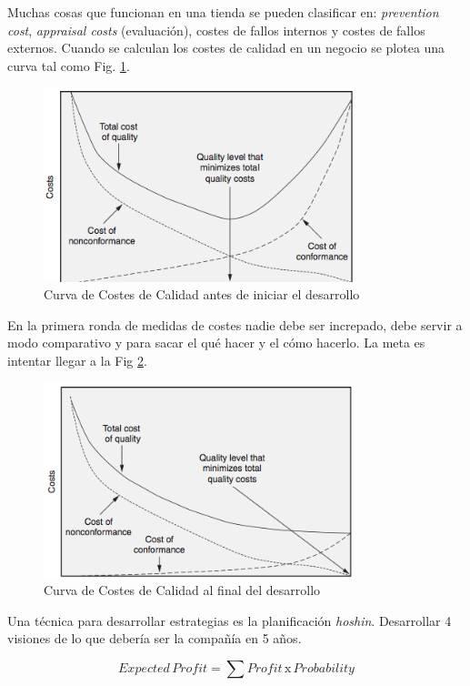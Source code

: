 \documentclass[]{article}
\begin{document}
Muchas cosas que funcionan en una tienda se pueden clasificar en: \textit{prevention cost}, \textit{appraisal costs} (evaluación), costes de fallos internos y costes de fallos externos. 
Cuando se calculan los costes de calidad en un negocio se plotea una curva tal como Fig. \ref{fig:CurvaCostesdeCalidadInicio}.
\begin{figure}[ht!]
\centering
\includegraphics[width=90mm]{imagenes/CurvaCostesCalidadInicio.png}
\caption{Curva de Costes de Calidad antes de iniciar el desarrollo}
\label{fig:CurvaCostesdeCalidadInicio}
\end{figure}

En la primera ronda de medidas de costes nadie debe ser increpado, debe servir a modo comparativo y para sacar el qué hacer y el cómo hacerlo. La meta es intentar llegar a la Fig \ref{fig:CurvaCostesdeCalidadFin}.

\begin{figure}[ht!]
	\centering
	\includegraphics[width=90mm]{imagenes/CurvaCostesCalidadFin.png}
	\caption{Curva de Costes de Calidad al final del desarrollo}
	\label{fig:CurvaCostesdeCalidadFin}
\end{figure}

Una técnica para desarrollar estrategias es la planificación \textit{hoshin}. Desarrollar 4 visiones de lo que debería ser la compañía en 5 años.

\begin{equation}
Expected \, Profit  = \sum Profit \, \mathrm{x} \, Probability
\end{equation}
\end{document}

